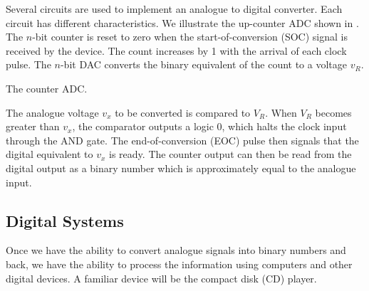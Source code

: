 \begin{slide}\label{slide:compare}
\begin{center}
\end{center}
\end{slide}

Several circuits are used to implement an analogue to digital
converter. Each circuit has different characteristics. We illustrate
the up-counter ADC shown in . The $n$-bit counter is
reset to zero when the start-of-conversion (SOC) signal is received by
the device. The count increases by 1 with the arrival of each clock
pulse. The $n$-bit DAC converts the binary equivalent of the count to
a voltage $v_R$. 

\begin{slide}\label{slide:ADC}
The counter ADC.
\begin{center}
\end{center}
\end{slide}

The analogue voltage $v_x$ to be converted is compared to $V_R$. When
$V_R$ becomes greater than $v_x$, the comparator outputs a logic 0,
which halts the clock input through the AND gate. The
end-of-conversion (EOC) pulse then signals that the digital equivalent
to $v_x$ is ready. The counter output can then be read from the
digital output as a binary number which is approximately equal to the
analogue input.

\subsection*{Digital Systems}

Once we have the ability to convert analogue signals into binary
numbers and back, we have the ability to process the information using
computers and other digital devices. A familiar device will be the
compact disk (CD) player.

